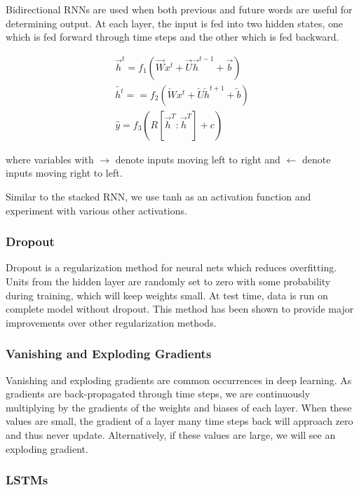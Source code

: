 \documentclass{article} %
\begin{document}
Bidirectional RNNs are used when both previous and future words are useful for
determining output. At each layer, the input is fed into two hidden states, one
which is fed forward through time steps and the other which is fed backward.

\begin{gather}
\overrightarrow{h}^t = 
f_1(\overrightarrow{W} x^t + 
\overrightarrow{U} \overrightarrow{h}^{t-1} + 
\overrightarrow{b}) \\
\overleftarrow{h^t} = 
= f_2(\overleftarrow{W} x^t + 
\overleftarrow{U} \overleftarrow{h}^{t+1} + 
\overleftarrow{b}) \\ 
\hat{y} = 
f_3(R[\overrightarrow{h}^T:\overrightarrow{h}^T] + c)
\end{gather}

where variables with $\rightarrow$ denote inputs moving left to right and
$\leftarrow$ denote inputs moving right to left.

Similar to the stacked RNN, we use tanh as an activation function and experiment
with various other activations.

\subsubsection{Dropout}

Dropout is a regularization method for neural nets which reduces overfitting.
Units from the hidden layer are randomly set to zero with some probability
during training, which will keep weights small. At test time, data is run on
complete model without dropout. This method has been shown to provide major
improvements over other regularization methods.

\subsubsection{Vanishing and Exploding Gradients}

Vanishing and exploding gradients are common occurrences in deep learning. As
gradients are back-propagated through time steps, we are continuously
multiplying by the gradients of the weights and biases of each layer. When these
values are small, the gradient of a layer many time steps back will approach
zero and thus never update. Alternatively, if these values are large, we will
see an exploding gradient.

\subsubsection*{LSTMs}
\end{document}
